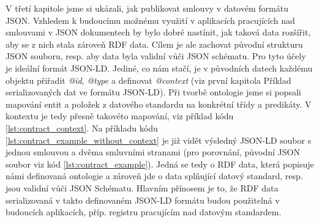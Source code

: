 V třetí kapitole jsme si ukázali, jak publikovat smlouvy v datovém formátu JSON. Vzhledem k budoucímu možnému využití v aplikacích pracujících nad smlouvami v JSON dokumentech by bylo dobré nastínit, jak taková data rozšířit, aby se z nich stala zároveň RDF data. Cílem je ale zachovat původní strukturu JSON souboru, resp. aby data byla validní vůči JSON schématu. Pro tyto účely je ideální formát JSON-LD. Jediné, co nám stačí, je v původních datech každému objektu přiřadit \textit{@id}, \textit{@type} a definovat \textit{@context} (viz první kapitola Příklad serializovaných dat ve formátu JSON-LD). Při tvorbě ontologie jsme si popsali mapování entit a položek z datového standardu na konkrétní třídy a predikáty. V kontextu je tedy přesně takovéto mapování, viz příklad kódu \ref{lst:contract_context}. Na příkladu kódu \ref{lst:contract_example_without_context} je již vidět výsledný JSON-LD soubor s jednou smlouvou a dvěma smluvními stranami (pro porovnání, původní JSON soubor viz kód \ref{lst:contract_example}). Jedná se tedy o RDF data, která popisuje námi definovaná ontologie a zároveň jde o data splňující datový standard, resp. jsou validní vůči JSON Schématu. Hlavním přínosem je to, že RDF data serializovaná v takto definovaném JSON-LD formátu budou použitelná v budoucích aplikacích, příp. registru pracujícím nad datovým standardem.



